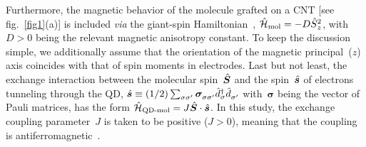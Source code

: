 \documentclass[doublecol]{epl2} %
\newcommand{\s}{\sigma}
\newcommand{\Ham}{\skew{3}{\hat}{\mathcal{H}}}
\newcommand{\vopS}{\skew{3}{\hat}{\bm{S}}}
\newcommand{\opS}{\skew{3}{\hat}{S}}
\newcommand{\vops}{\skew{3}{\hat}{\bm{s}}}
\newcommand{\opd}{\skew{3}{\hat}{d}}
\newcommand{\veco}[1]{\hat{\bm{#1}}}
\newcommand{\via}{\emph{via}\xspace}
\begin{document}
%
Furthermore, the magnetic behavior of the molecule grafted on a CNT [see fig.~\ref{fig1}(a)] is included \via the giant-spin Hamiltonian~\cite{Gatteschi_book},
%
\mbox{$
	\Ham_\text{mol}
	=
	-D\opS_z^2
$},
%
with \mbox{$D>0$} being the relevant magnetic anisotropy constant.  To keep the discussion simple, we additionally assume that the orientation of the magnetic principal~($z$) axis coincides with that of spin moments in electrodes.
%
%
Last but not least, the exchange interaction between the molecular spin~$\vopS$ and the spin~$\vops$ of electrons tunneling through the QD,
%
\mbox{$
	\vops
	\equiv
	(1/2)
	\sum_{\s\s^\prime}
	\bm{\sigma}_{\s\s^\prime}^{}
	\opd_\s^\dag
	\opd_{\s^\prime}^{}
$}
%
with~$\bm{\sigma}$ being the vector of Pauli matrices, has the form
%
\mbox{$
	\Ham_\text{QD-mol}
	=
	J\veco{S}\cdot\veco{s}
$}.
%
In this study, the exchange coupling parameter~$J$ is taken to be positive (\mbox{$J>0$}), meaning that the coupling is antiferromagnetic~\cite{Urdampilleta2011Jul}.


\end{document}
